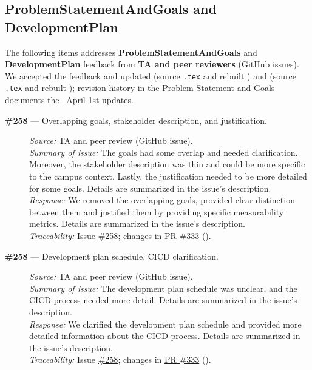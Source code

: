 \documentclass{article}
\begin{document}

\subsection{ProblemStatementAndGoals and DevelopmentPlan}
The following items addresses \textbf{ProblemStatementAndGoals} and \textbf{DevelopmentPlan} feedback from \textbf{TA and peer reviewers} (GitHub issues). We accepted the feedback and updated  (source \texttt{.tex} and rebuilt ) and  (source \texttt{.tex} and rebuilt ); revision history in the Problem Statement and Goals documents the ~April 1st updates.
\begin{description}
  \item[\textbf{\#258} --- Overlapping goals, stakeholder description, and justification.]
  \textit{Source:} TA and peer review (GitHub issue). \\
  \textit{Summary of issue:} The goals had some overlap and needed clarification. Moreover, the stakeholder description was thin and could be more specific to the campus context. Lastly, the justification needed to be more detailed for some goals. Details are summarized in the issue's description. \\
  \textit{Response:} We removed the overlapping goals, provided clear distinction between them and justified them by providing specific measurability metrics. Details are summarized in the issue's description. \\
  \textit{Traceability:} Issue \href{https://github.com/hitchly/hitchly/issues/258}{\#258}; changes in \href{https://github.com/hitchly/hitchly/pull/333}{PR \#333} ().

\item[\textbf{\#258} --- Development plan schedule, CICD clarification.]
  \textit{Source:} TA and peer review (GitHub issue). \\
  \textit{Summary of issue:} The development plan schedule was unclear, and the CICD process needed more detail. Details are summarized in the issue's description. \\
  \textit{Response:} We clarified the development plan schedule and provided more detailed information about the CICD process. Details are summarized in the issue's description. \\
  \textit{Traceability:}  Issue \href{https://github.com/hitchly/hitchly/issues/258}{\#258}; changes in \href{https://github.com/hitchly/hitchly/pull/333}{PR \#333} ().  
\end{description}
\end{document}
